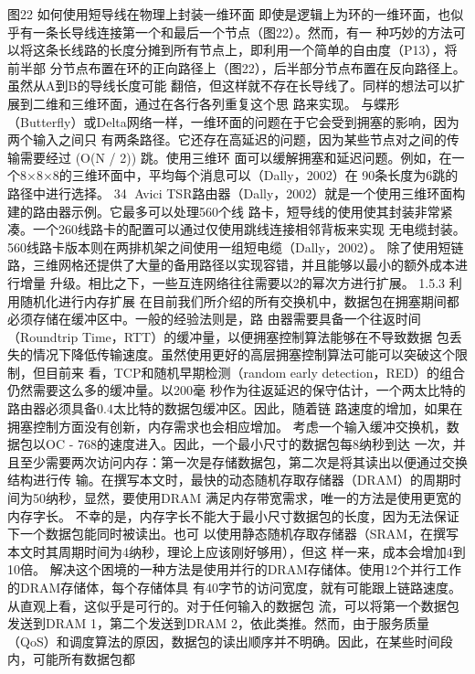 图22 如何使用短导线在物理上封装一维环面
即使是逻辑上为环的一维环面，也似乎有一条长导线连接第一个和最后一个节点（图22）。然而，有一
种巧妙的方法可以将这条长线路的长度分摊到所有节点上，即利用一个简单的自由度（P13），将前半部
分节点布置在环的正向路径上（图22），后半部分节点布置在反向路径上。虽然从A到B的导线长度可能
翻倍，但这样就不存在长导线了。同样的想法可以扩展到二维和三维环面，通过在各行各列重复这个思
路来实现。
与蝶形（Butterfly）或Delta网络一样，一维环面的问题在于它会受到拥塞的影响，因为两个输入之间只
有两条路径。它还存在高延迟的问题，因为某些节点对之间的传输需要经过 (O(N / 2)) 跳。使用三维环
面可以缓解拥塞和延迟问题。例如，在一个8×8×8的三维环面中，平均每个消息可以（Dally，2002）在
90条长度为6跳的路径中进行选择。
                                                          34
Avici TSR路由器（Dally，2002）就是一个使用三维环面构建的路由器示例。它最多可以处理560个线
路卡，短导线的使用使其封装非常紧凑。一个260线路卡的配置可以通过仅使用跳线连接相邻背板来实现
无电缆封装。560线路卡版本则在两排机架之间使用一组短电缆（Dally，2002）。
除了使用短链路，三维网格还提供了大量的备用路径以实现容错，并且能够以最小的额外成本进行增量
升级。相比之下，一些互连网络往往需要以2的幂次方进行扩展。
1.5.3 利用随机化进行内存扩展
在目前我们所介绍的所有交换机中，数据包在拥塞期间都必须存储在缓冲区中。一般的经验法则是，路
由器需要具备一个往返时间（Roundtrip Time，RTT）的缓冲量，以便拥塞控制算法能够在不导致数据
包丢失的情况下降低传输速度。虽然使用更好的高层拥塞控制算法可能可以突破这个限制，但目前来
看，TCP和随机早期检测（random early detection，RED）的组合仍然需要这么多的缓冲量。以200毫
秒作为往返延迟的保守估计，一个两太比特的路由器必须具备0.4太比特的数据包缓冲区。因此，随着链
路速度的增加，如果在拥塞控制方面没有创新，内存需求也会相应增加。
考虑一个输入缓冲交换机，数据包以OC - 768的速度进入。因此，一个最小尺寸的数据包每8纳秒到达
一次，并且至少需要两次访问内存：第一次是存储数据包，第二次是将其读出以便通过交换结构进行传
输。在撰写本文时，最快的动态随机存取存储器（DRAM）的周期时间为50纳秒，显然，要使用DRAM
满足内存带宽需求，唯一的方法是使用更宽的内存字长。
不幸的是，内存字长不能大于最小尺寸数据包的长度，因为无法保证下一个数据包能同时被读出。也可
以使用静态随机存取存储器（SRAM，在撰写本文时其周期时间为4纳秒，理论上应该刚好够用），但这
样一来，成本会增加4到10倍。
解决这个困境的一种方法是使用并行的DRAM存储体。使用12个并行工作的DRAM存储体，每个存储体具
有40字节的访问宽度，就有可能跟上链路速度。从直观上看，这似乎是可行的。对于任何输入的数据包
流，可以将第一个数据包发送到DRAM 1，第二个发送到DRAM 2，依此类推。然而，由于服务质量
（QoS）和调度算法的原因，数据包的读出顺序并不明确。因此，在某些时间段内，可能所有数据包都
